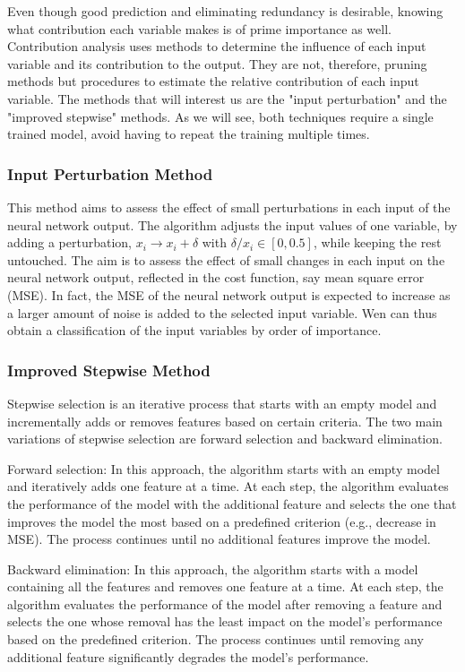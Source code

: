 \documentclass{report}
\begin{document}
Even though good prediction and eliminating redundancy is desirable, knowing what contribution each variable makes is of prime importance as well. Contribution analysis uses methods to determine the influence of each input variable and its contribution to the output. They are not, therefore, pruning methods but procedures to estimate the relative contribution of each input variable. The methods that will interest us are the "input perturbation" and the "improved stepwise" methods. As we will see, both techniques require a single trained model, avoid having to repeat the training multiple times.

\subsubsection{Input Perturbation Method}

This method aims to assess the effect of small perturbations in each input of the neural network output. The algorithm adjusts the input values of one variable, by adding a perturbation, $x_i\rightarrow x_i + \delta$ with $\delta/x_i\in[0,0.5]$, while keeping the rest untouched. The aim is to assess the effect of small changes in each input on the neural network output, reflected in the cost function, say mean square error (MSE). In fact, the MSE of the neural network output is expected to increase as a larger amount of noise is added to the selected input variable. Wen can thus obtain a classification of the input variables by order of importance.

\subsubsection{Improved Stepwise Method}

Stepwise selection is an iterative process that starts with an empty model and incrementally adds or removes features based on certain criteria. The two main variations of stepwise selection are forward selection and backward elimination.

Forward selection: In this approach, the algorithm starts with an empty model and iteratively adds one feature at a time. At each step, the algorithm evaluates the performance of the model with the additional feature and selects the one that improves the model the most based on a predefined criterion (e.g., decrease in MSE). The process continues until no additional features improve the model.

Backward elimination: In this approach, the algorithm starts with a model containing all the features and removes one feature at a time. At each step, the algorithm evaluates the performance of the model after removing a feature and selects the one whose removal has the least impact on the model's performance based on the predefined criterion. The process continues until removing any additional feature significantly degrades the model's performance.
\end{document}
